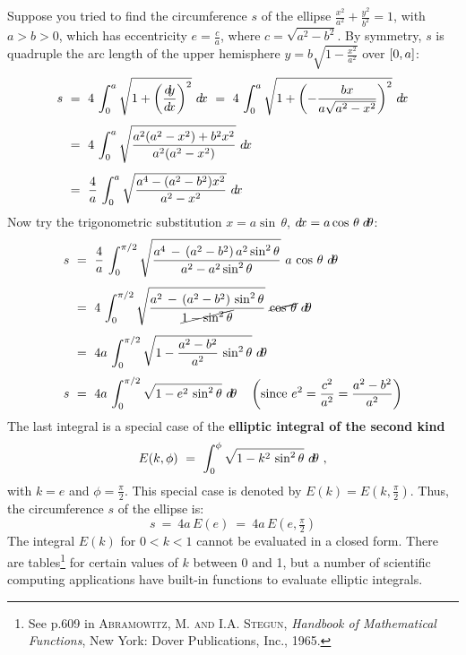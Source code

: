 Suppose you tried to find the circumference $s$ of the ellipse
$\frac{x^2}{a^2}+\frac{y^2}{b^2}=1$, with $a>b>0$, which has eccentricity
$e=\frac{c}{a}$, where $c=\sqrt{a^2-b^2}$. By symmetry, $s$ is quadruple the arc
length of the upper hemisphere $y=b\sqrt{1-\frac{x^2}{a^2}}$ over $\lbrack 0,a \rbrack$:
\begin{align*}
s ~&=~ 4\,\int_0^{a} \sqrt{1 + \left(\frac{d\negmedspace y}{d\!x}\right)^2}~d\!x ~=~
       4\,\int_0^{a} \sqrt{1 + \left(-\frac{bx}{a \sqrt{a^2 - x^2}}\right)^2}~d\!x\\[4pt]
&=~ 4\,\int_0^{a} \sqrt{\frac{a^2 (a^2-x^2) + b^2x^2}{a^2 (a^2 - x^2)}}~d\!x\\[4pt]
&=~ \frac{4}{a}\,\int_0^{a} \sqrt{\frac{a^4 - (a^2-b^2) x^2}{a^2 - x^2}}~d\!x
\end{align*}
Now try the trigonometric substitution $x=a \sin\,\theta$,
$d\!x=a \cos\,\theta\;d\!\theta$:
\newpage
\begin{align*}
s ~&=~ \frac{4}{a}\,\int_0^{\pi/2} \sqrt{\frac{a^4 \,-\, (a^2-b^2)\,a^2 \sin^2 \theta}
        {a^2 - a^2 \sin^2 \theta}}~a\,\cos\,\theta~d\!\theta\\[4pt]
&=~ 4\,\int_0^{\pi/2} \sqrt{\frac{a^2 \,-\, (a^2-b^2)\,\sin^2 \theta}
        {\cancel{1 - \sin^2 \theta}}}~\cancel{\cos\,\theta}~d\!\theta\\[4pt]
&=~ 4a\,\int_0^{\pi/2} \sqrt{1 - \frac{a^2 - b^2}{a^2}\,\sin^2 \theta}~d\!\theta\\[3pt]
s ~&=~ 4a\,\int_0^{\pi/2} \sqrt{1 - e^2\,\sin^2 \theta}~d\!\theta
\quad\left(\text{since $e^2 = \frac{c^2}{a^2} = \frac{a^2 - b^2}{a^2}$}\right)
\end{align*}
The last integral is a special case of the \textbf{elliptic integral of the
second kind}
\[
E(k,\phi) ~=~ \int_0^{\phi} \sqrt{1 - k^2\,\sin^2 \theta}~d\!\theta ~,
\]
with $k=e$ and $\phi = \frac{\pi}{2}$. This special case is denoted by
$E(k) = E(k,\frac{\pi}{2})$. Thus, the circumference $s$ of the
ellipse is:
\[
s ~=~ 4a\,E(e) ~=~ 4a\,E(e,\tfrac{\pi}{2})
\]
The integral $E(k)$ for $0<k<1$ cannot be evaluated in a closed
form. There are tables\footnote{See p.609 in \textsc{Abramowitz, M. and
I.A. Stegun}, \emph{Handbook of Mathematical Functions}, New York: Dover
Publications, Inc., 1965.} for certain values of $k$ between 0 and 1, but a
number of scientific computing applications have built-in functions to evaluate
elliptic integrals.

